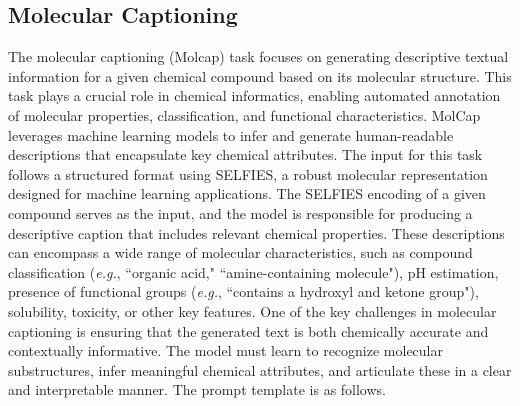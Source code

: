 \subsection{Molecular Captioning}
The molecular captioning (Molcap) task focuses on generating descriptive textual information for a given chemical compound based on its molecular structure. This task plays a crucial role in chemical informatics, enabling automated annotation of molecular properties, classification, and functional characteristics. MolCap leverages machine learning models to infer and generate human-readable descriptions that encapsulate key chemical attributes. The input for this task follows a structured format using SELFIES, a robust molecular representation designed for machine learning applications. The SELFIES encoding of a given compound serves as the input, and the model is responsible for producing a descriptive caption that includes relevant chemical properties. These descriptions can encompass a wide range of molecular characteristics, such as compound classification (\emph{e.g.}, ``organic acid," ``amine-containing molecule"), pH estimation, presence of functional groups (\emph{e.g.}, ``contains a hydroxyl and ketone group"), solubility, toxicity, or other key features.
One of the key challenges in molecular captioning is ensuring that the generated text is both chemically accurate and contextually informative. The model must learn to recognize molecular substructures, infer meaningful chemical attributes, and articulate these in a clear and interpretable manner. The prompt template is as follows.


